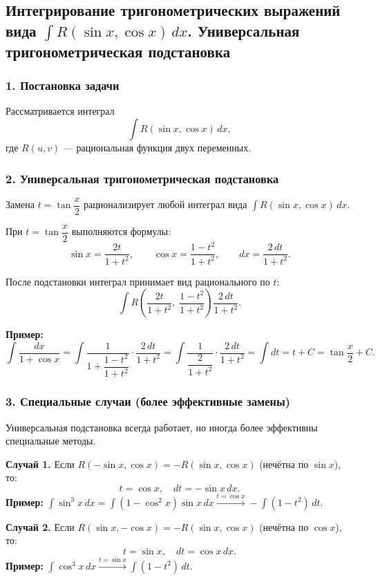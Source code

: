 \subsection{Интегрирование тригонометрических выражений вида $\int R(\sin x, \cos x)\,dx$. Универсальная тригонометрическая подстановка}

\subsubsection*{1. Постановка задачи}

Рассматривается интеграл
\[
\int R(\sin x,\cos x)\,dx,
\]
где $R(u,v)$ — рациональная функция двух переменных.

\subsubsection*{2. Универсальная тригонометрическая подстановка}

\begin{theorem}
Замена $t = \tan\!\dfrac{x}{2}$ рационализирует любой интеграл вида $\int R(\sin x, \cos x)\,dx$.
\end{theorem}

При $t = \tan\dfrac{x}{2}$ выполняются формулы:
\[
\sin x = \frac{2t}{1+t^2}, \qquad
\cos x = \frac{1-t^2}{1+t^2}, \qquad
dx = \frac{2\,dt}{1+t^2}.
\]

После подстановки интеграл принимает вид рационального по $t$:
\[
\int R\!\left(\frac{2t}{1+t^2},\;\frac{1-t^2}{1+t^2}\right)\frac{2\,dt}{1+t^2}.
\]

\textbf{Пример:}
\[
\int\frac{dx}{1+\cos x}
= \int\frac{1}{1+\dfrac{1-t^2}{1+t^2}}\cdot\frac{2\,dt}{1+t^2}
= \int\frac{1}{\dfrac{2}{1+t^2}}\cdot\frac{2\,dt}{1+t^2}
= \int dt = t + C = \tan\frac{x}{2}+C.
\]

\subsubsection*{3. Специальные случаи (более эффективные замены)}

Универсальная подстановка всегда работает, но иногда более эффективны специальные методы.

\textbf{Случай 1.} Если $R(-\sin x, \cos x) = -R(\sin x, \cos x)$ (нечётна по $\sin x$), то:
\[
t = \cos x, \quad dt = -\sin x\,dx.
\]
\textbf{Пример:} $\int \sin^3 x\,dx = \int(1-\cos^2 x)\sin x\,dx \xrightarrow{t=\cos x} -\int(1-t^2)\,dt$.

\textbf{Случай 2.} Если $R(\sin x, -\cos x) = -R(\sin x, \cos x)$ (нечётна по $\cos x$), то:
\[
t = \sin x, \quad dt = \cos x\,dx.
\]
\textbf{Пример:} $\int \cos^3 x\,dx \xrightarrow{t=\sin x} \int(1-t^2)\,dt$.

